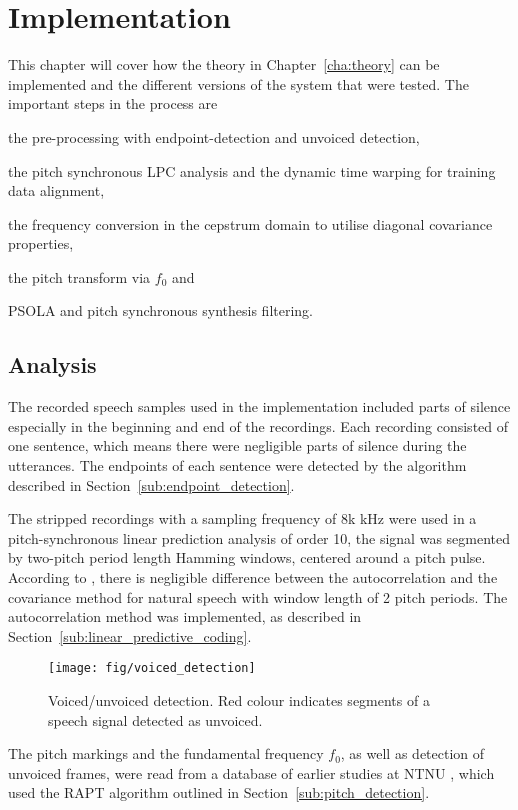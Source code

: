 \chapter{Implementation} %
\label{cha:implementation}
This chapter will cover how the theory in Chapter~\ref{cha:theory} can be implemented and the different versions of the system that were tested. The important steps in the process are \begin{inparaenum}  \item the pre-processing with endpoint-detection and unvoiced detection, \item the pitch synchronous LPC analysis and the dynamic time warping for training data alignment, \item the frequency conversion in the cepstrum domain to utilise diagonal covariance properties, \item the pitch transform via $f_0$ and \item PSOLA and pitch synchronous synthesis filtering. \end{inparaenum}

\section{Analysis} %
\label{sec:analysis}
The recorded speech samples used in the implementation included parts of silence especially in the beginning and end of the recordings. Each recording consisted of one sentence, which means there were negligible parts of silence during the utterances. The endpoints of each sentence were detected by the algorithm described in Section~\ref{sub:endpoint_detection}.

The stripped recordings with a sampling frequency of 8k kHz were used in a pitch-synchronous linear prediction analysis of order 10, \ie the signal was segmented by two-pitch period length Hamming windows, centered around a pitch pulse. According to \cite{chandra74}, there is negligible difference between the autocorrelation and the covariance method for natural speech with window length of 2 pitch periods. The autocorrelation method was implemented, as described in Section~\ref{sub:linear_predictive_coding}. 
\begin{figure}[htbp]
	\begin{center}
		\texttt{[image: fig/voiced\_detection]}
		\caption{Voiced/unvoiced detection. Red colour indicates segments of a speech signal detected as unvoiced.}
		\label{fig:voiced_detection}
	\end{center}
\end{figure}
The pitch markings and the fundamental frequency $f_0$, as well as detection of unvoiced frames, were read from a database of earlier studies at NTNU \cite{fonema}, which used the RAPT algorithm outlined in Section~\ref{sub:pitch_detection}.


